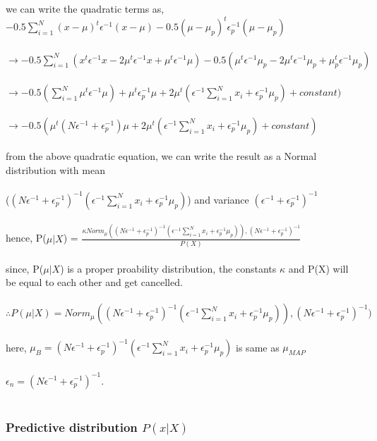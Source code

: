 \documentclass[fleqn]{article}
\begin{document}
we can write the quadratic terms as, $-0.5\sum_{i=1}^N(x-\mu)^t\epsilon^{-1}(x-\mu) -0.5(\mu-\mu_p)^t\epsilon_p^{-1}(\mu-\mu_p)$\\\\
 $\longrightarrow -0.5\sum_{i=1}^N(x^t\epsilon^{-1}x-2\mu^t\epsilon^{-1}x+\mu^t\epsilon^{-1}\mu) - 0.5(\mu^t\epsilon^{-1}\mu_p-2\mu^t\epsilon^{-1}\mu_p+\mu_p^t\epsilon^{-1}\mu_p)$\\\\
 $\longrightarrow -0.5(\sum_{i=1}^N\mu^t\epsilon^{-1}\mu) + \mu^t\epsilon_p^{-1}\mu + 2\mu^t(\epsilon^{-1}\sum_{i=1}^Nx_i + \epsilon_p^{-1}\mu_p) + constant)$\\\\
 $\longrightarrow -0.5(\mu^t(N\epsilon^{-1} + \epsilon_p^{-1})\mu + 2\mu^t(\epsilon^{-1}\sum_{i=1}^Nx_i + \epsilon_p^{-1}\mu_p) + constant)$\\\\
 from the above quadratic equation, we can write the result as a Normal distribution with mean \\\\ ($(N\epsilon^{-1} + \epsilon_p^{-1})^{-1}{(\epsilon^{-1}\sum_{i=1}^Nx_i + \epsilon_p^{-1}\mu_p)}$) and variance $(\epsilon^{-1} + \epsilon_p^{-1})^{-1}$\\\\
 
hence, P($\mu|X$) = $\frac{\kappa Norm_\mu((N\epsilon^{-1} + \epsilon_p^{-1})^{-1}{(\epsilon^{-1}\sum_{i=1}^Nx_i + \epsilon_p^{-1}\mu_p)}), (N\epsilon^{-1} + \epsilon_p^{-1})^{-1}}{P(X)}$\\\\
since, P($\mu|X$) is a proper proability distribution, the constants $\kappa$ and P(X) will be equal to each other and get cancelled.\\\\
$\therefore P(\mu|X) = Norm_\mu((N\epsilon^{-1} + \epsilon_p^{-1})^{-1}{(\epsilon^{-1}\sum_{i=1}^Nx_i + \epsilon_p^{-1}\mu_p)}), (N\epsilon^{-1} + \epsilon_p^{-1})^{-1})$ \\\\
here, $\mu_B = (N\epsilon^{-1} + \epsilon_p^{-1})^{-1}{(\epsilon^{-1}\sum_{i=1}^Nx_i + \epsilon_p^{-1}\mu_p)}$ is same as $\mu_{MAP}$\\\\
$\epsilon_n = (N\epsilon^{-1} + \epsilon_p^{-1})^{-1}$.\\\\

\subsubsection{Predictive distribution $P(x|X)$}
\end{document}
